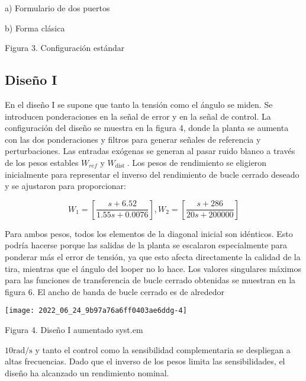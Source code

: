 a) Formulario de dos puertos

b) Forma clásica

Figura 3. Configuración estándar

\subsection{Diseño I}
En el diseño I se supone que tanto la tensión como el ángulo se miden. Se introducen ponderaciones en la señal de error y en la señal de control. La configuración del diseño se muestra en la figura 4, donde la planta se aumenta con las dos ponderaciones y filtros para generar señales de referencia y perturbaciones. Las entradas exógenas se generan al pasar ruido blanco a través de los pesos estables $W_{r e f}$ y $W_{\text {dist }}$. Los pesos de rendimiento se eligieron inicialmente para representar el inverso del rendimiento de bucle cerrado deseado y se ajustaron para proporcionar:

$$
W_{1}=\left[\frac{s+6.52}{1.55 s+0.0076}\right], W_{2}=\left[\frac{s+286}{20 s+200000}\right]
$$

Para ambos pesos, todos los elementos de la diagonal inicial son idénticos. Esto podría hacerse porque las salidas de la planta se escalaron especialmente para ponderar más el error de tensión, ya que esto afecta directamente la calidad de la tira, mientras que el ángulo del looper no lo hace. Los valores singulares máximos para las funciones de transferencia de bucle cerrado obtenidas se muestran en la figura 6. El ancho de banda de bucle cerrado es de alrededor

\begin{center}
\texttt{[image: 2022\_06\_24\_9b97a76a6ff0403ae6ddg-4]}
\end{center}

Figura 4. Diseño I aumentado syst.em

$10 \mathrm{rad} / \mathrm{s}$ y tanto el control como la sensibilidad complementaria se despliegan a altas frecuencias. Dado que el inverso de los pesos limita las sensibilidades, el diseño ha alcanzado un rendimiento nominal.

